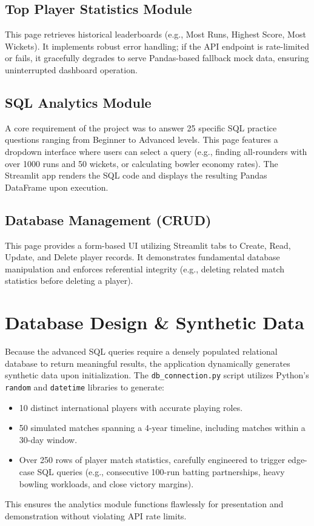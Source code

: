 \documentclass[11pt, a4paper]{article}
\begin{document}
	\subsection{Top Player Statistics Module}
	This page retrieves historical leaderboards (e.g., Most Runs, Highest Score, Most Wickets). It implements robust error handling; if the API endpoint is rate-limited or fails, it gracefully degrades to serve Pandas-based fallback mock data, ensuring uninterrupted dashboard operation.
	
	\subsection{SQL Analytics Module}
	A core requirement of the project was to answer 25 specific SQL practice questions ranging from Beginner to Advanced levels. This page features a dropdown interface where users can select a query (e.g., finding all-rounders with over 1000 runs and 50 wickets, or calculating bowler economy rates). The Streamlit app renders the SQL code and displays the resulting Pandas DataFrame upon execution.
	
	\subsection{Database Management (CRUD)}
	This page provides a form-based UI utilizing Streamlit tabs to Create, Read, Update, and Delete player records. It demonstrates fundamental database manipulation and enforces referential integrity (e.g., deleting related match statistics before deleting a player).
	
	\section{Database Design \& Synthetic Data}
	Because the advanced SQL queries require a densely populated relational database to return meaningful results, the application dynamically generates synthetic data upon initialization. The \texttt{db\_connection.py} script utilizes Python's \texttt{random} and \texttt{datetime} libraries to generate:
	\begin{itemize}
		\item 10 distinct international players with accurate playing roles.
		\item 50 simulated matches spanning a 4-year timeline, including matches within a 30-day window.
		\item Over 250 rows of player match statistics, carefully engineered to trigger edge-case SQL queries (e.g., consecutive 100-run batting partnerships, heavy bowling workloads, and close victory margins).
	\end{itemize}
	This ensures the analytics module functions flawlessly for presentation and demonstration without violating API rate limits.
	
\end{document}
